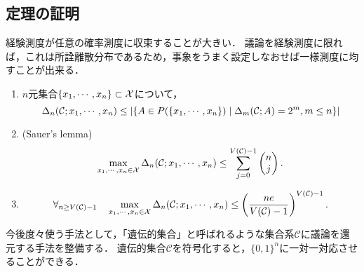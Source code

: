 \documentclass[uplatex,dvipdfmx]{jsreport}
\renewcommand{\C}{\mathcal{C}}
\begin{document}
\subsection{定理の証明}

\begin{tcolorbox}[colframe=ForestGreen, colback=ForestGreen!10!white,breakable,colbacktitle=ForestGreen!40!white,coltitle=black,fonttitle=\bfseries\sffamily,
title=]
    経験測度が任意の確率測度に収束することが大きい．
    議論を経験測度に限れば，これは所詮離散分布であるため，事象をうまく設定しなおせば一様測度に均すことが出来る．

\end{tcolorbox}

\begin{lemma}\mbox{}
    \begin{enumerate}
        \item $n$元集合$\{x_1,\cdots,x_n\}\subset\mathcal{X}$について，
        \[\Delta_n(\mathcal{C};x_1,\cdots,x_n)\le\left|\left\{A\in P(\{x_1,\cdots,x_n\})\mid\Delta_m(\mathcal{C};A)=2^m,m\le n\right\}\right|\]
        \item (Sauer's lemma) \[\max_{x_1,\cdots,x_n\in\mathcal{X}}\Delta_n(\mathcal{C};x_1,\cdots,x_n)\le\sum^{V(\mathcal{C})-1}_{j=0}\begin{pmatrix}n\\j\end{pmatrix}.\]
        \item \[\forall_{n\ge V(\C)-1}\quad\max_{x_1,\cdots,x_n\in\X}\Delta_n(\cC;x_1,\cdots,x_n)\le\paren{\frac{ne}{V(\cC)-1}}^{V(\cC)-1}.\]
    \end{enumerate}
\end{lemma}
\begin{remarks}
    今後度々使う手法として，「遺伝的集合」と呼ばれるような集合系$\C$に議論を還元する手法を整備する．
    遺伝的集合$\C$を符号化すると，$\{0,1\}^n$に一対一対応させることができる．
\end{remarks}
\end{document}
